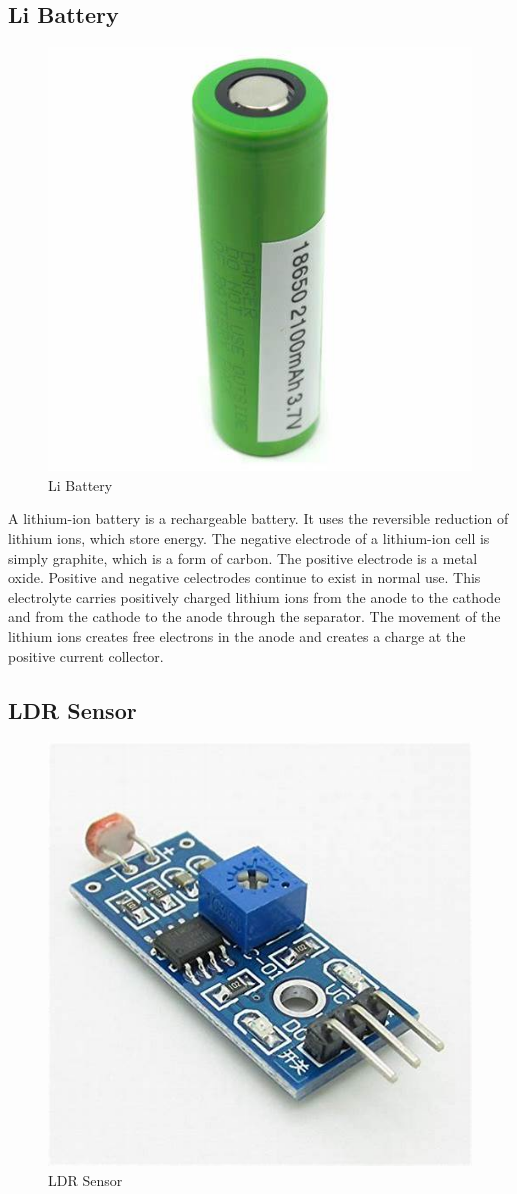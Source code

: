 \documentclass[conference]{IEEEtran}
\begin{document}
                 
\subsection{Li Battery}
\begin{figure}
    \centering
    \includegraphics[width=0.5\linewidth]{Li Battery.png}
    \caption{Li Battery}
    \label{fig:enter-label}
\end{figure}
A lithium-ion battery is a rechargeable battery. It uses the reversible reduction of lithium ions, which store energy. The negative electrode of a lithium-ion cell is simply graphite, which is a form of carbon. The positive electrode is a metal oxide. Positive and negative celectrodes continue to exist in normal use. This electrolyte carries positively charged lithium ions from the anode to the cathode and from the cathode to the anode through the separator. The movement of the lithium ions creates free electrons in the anode and creates a charge at the positive current collector. 

\subsection{LDR Sensor}
\begin{figure}
    \centering
    \includegraphics[width=0.5\linewidth]{image.png}
    \caption{LDR Sensor}
    \label{fig:enter-label}
\end{figure}
\end{document}
